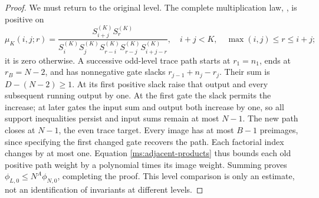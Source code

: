 \begin{proof}
We must return to the original level. The complete multiplication
law, \cite[Theorem 3.3]{Newton}, is positive on
\begin{equation}\label{ms:level-gate}
 \mu_K(i,j;r)=
 \frac{S_{i+j}^{(K)}S_r^{(K)}}
 {S_i^{(K)}S_j^{(K)}S_{r-i}^{(K)}S_{r-j}^{(K)}S_{i+j-r}^{(K)}},
 \quad i+j<K,\quad\max(i,j)\le r\le i+j;
\end{equation}
it is zero otherwise. A successive odd-level trace path starts at
$r_1=n_1$, ends at $r_B=N-2$, and has nonnegative gate slacks
$r_{j-1}+n_j-r_j$. Their sum is $D-(N-2)\ge1$. At its first
positive slack raise that output and every subsequent running
output by one. At the first gate the slack permits the increase;
at later gates the input sum and output both increase by one, so
all support inequalities persist and input sums remain at most
$N-1$. The new path closes at $N-1$, the even trace target.
Every image has at most $B-1$ preimages, since specifying the first
changed gate recovers the path. Each factorial index changes by at
most one. Equation \eqref{ms:adjacent-products} thus bounds each
old positive path weight by a polynomial times its image weight.
Summing proves $\phi_{L,0}\le N^A\phi_{N,0}$, completing the proof.
This level comparison is only an estimate, not an identification of
invariants at different levels.
\end{proof}

